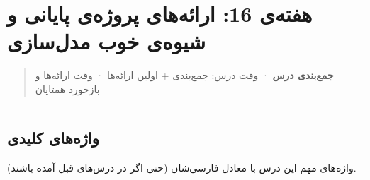 \section{هفته‌ی 16: ارائه‌های پروژه‌ی پایانی و شیوه‌ی خوب مدل‌سازی}

\begin{quote}
\textbf{جمع‌بندی درس} · وقت درس: جمع‌بندی + اولین ارائه‌ها · وقت 
ارائه‌ها و بازخورد همتایان
\end{quote}

\begin{center}\rule{0.5\linewidth}{0.5pt}\end{center}

\subsection{واژه‌های کلیدی}

واژه‌های مهم این درس با معادل فارسی‌شان (حتی اگر در درس‌های قبل آمده
باشند).

